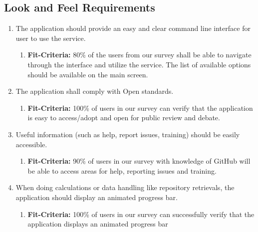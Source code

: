 \documentclass{article}
\begin{document}
\subsection{Look and Feel Requirements}
\begin{enumerate}
\item The application should provide an easy and clear command line interface for user to use the service.
   \begin{enumerate}
    \item \textbf{Fit-Criteria:} 80\% of the users from our survey shall be able to navigate through the interface and utilize the service. The list of available options should be available on the main screen. 
    \end{enumerate}
\item The application shall comply with Open standards.
   \begin{enumerate}
    \item \textbf{Fit-Criteria:} 100\% of users in our survey  can verify that the application is easy to access\//adopt and open for public review and debate.
    \end{enumerate}
\item Useful information (such as help, report issues, training) should be easily accessible.
   \begin{enumerate}
    \item \textbf{Fit-Criteria:} 90\% of users in our survey with knowledge of GitHub will be able to access areas for help, reporting issues and training. 
    \end{enumerate}
\item When doing calculations or data handling like repository retrievals, the application should display an animated progress bar. 
   \begin{enumerate}
    \item \textbf{Fit-Criteria:}  100\% of users in our survey  can successfully verify that the application displays an animated progress bar 
    \end{enumerate}
\end{enumerate}
\end{document}
